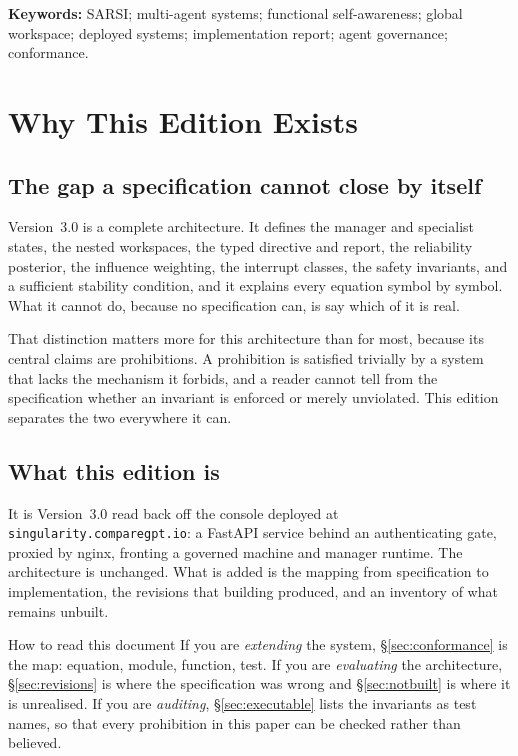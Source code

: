 \documentclass[11pt]{article}
\begin{document}
\vspace{2pt}
\noindent\textbf{Keywords:} SARSI; multi-agent systems; functional self-awareness; global workspace; deployed systems; implementation report; agent governance; conformance.

\tableofcontents
\newpage

\section{Why This Edition Exists}
\label{sec:why}

\subsection{The gap a specification cannot close by itself}

Version~3.0 is a complete architecture. It defines the manager and specialist states, the nested workspaces, the typed directive and report, the reliability posterior, the influence weighting, the interrupt classes, the safety invariants, and a sufficient stability condition, and it explains every equation symbol by symbol. What it cannot do, because no specification can, is say which of it is real.

That distinction matters more for this architecture than for most, because its central claims are prohibitions. A prohibition is satisfied trivially by a system that lacks the mechanism it forbids, and a reader cannot tell from the specification whether an invariant is enforced or merely unviolated. This edition separates the two everywhere it can.

\subsection{What this edition is}

It is Version~3.0 read back off the console deployed at \texttt{singularity.comparegpt.io}: a FastAPI service behind an authenticating gate, proxied by nginx, fronting a governed machine and manager runtime. The architecture is unchanged. What is added is the mapping from specification to implementation, the revisions that building produced, and an inventory of what remains unbuilt.

\begin{claimbox}{How to read this document}
If you are \emph{extending} the system, \S\ref{sec:conformance} is the map: equation, module, function, test. If you are \emph{evaluating} the architecture, \S\ref{sec:revisions} is where the specification was wrong and \S\ref{sec:notbuilt} is where it is unrealised. If you are \emph{auditing}, \S\ref{sec:executable} lists the invariants as test names, so that every prohibition in this paper can be checked rather than believed.
\end{claimbox}
\end{document}
